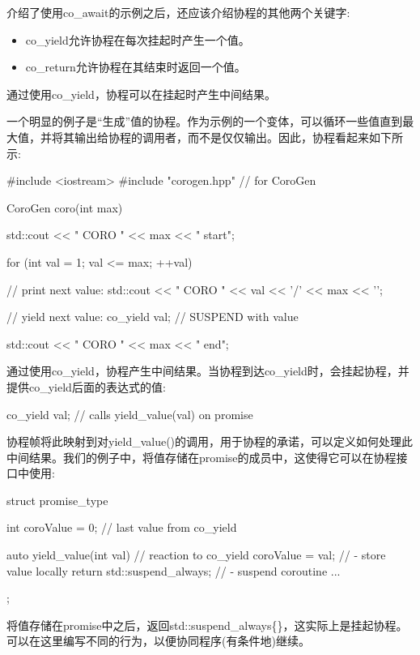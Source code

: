 
介绍了使用co\_await的示例之后，还应该介绍协程的其他两个关键字:

\begin{itemize}
\item
co\_yield允许协程在每次挂起时产生一个值。

\item
co\_return允许协程在其结束时返回一个值。
\end{itemize}


通过使用co\_yield，协程可以在挂起时产生中间结果。

一个明显的例子是“生成”值的协程。作为示例的一个变体，可以循环一些值直到最大值，并将其输出给协程的调用者，而不是仅仅输出。因此，协程看起来如下所示:


\begin{cpp}
#include <iostream>
#include "corogen.hpp" // for CoroGen

CoroGen coro(int max)
{
	std::cout << "            CORO " << max << " start\n";

	for (int val = 1; val <= max; ++val) {
		// print next value:
		std::cout << "              CORO " << val << '/' << max << '\n';

		// yield next value:
		co_yield val; // SUSPEND with value
	}
	std::cout << "            CORO " << max << " end\n";
}
\end{cpp}

通过使用co\_yield，协程产生中间结果。当协程到达co\_yield时，会挂起协程，并提供co\_yield后面的表达式的值:

\begin{cpp}
co_yield val; // calls yield_value(val) on promise
\end{cpp}

协程帧将此映射到对yield\_value()的调用，用于协程的承诺，可以定义如何处理此中间结果。我们的例子中，将值存储在promise的成员中，这使得它可以在协程接口中使用:

\begin{cpp}
struct promise_type {
	int coroValue = 0; // last value from co_yield

	auto yield_value(int val) { // reaction to co_yield
	coroValue = val; // - store value locally
	return std::suspend_always{}; // - suspend coroutine
	}
	...
};
\end{cpp}

将值存储在promise中之后，返回std::suspend\_always\{\}，这实际上是挂起协程。可以在这里编写不同的行为，以便协同程序(有条件地)继续。

